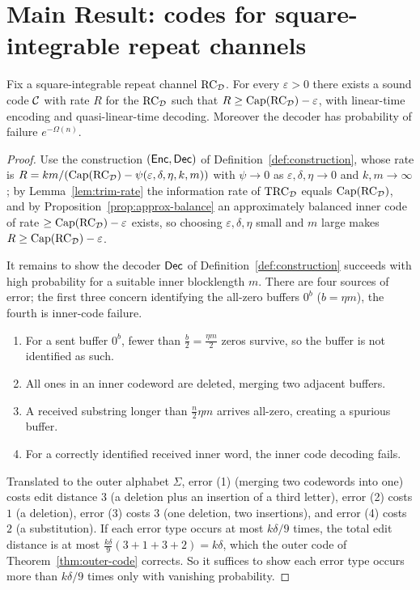 \chapter{Main Result: codes for square-integrable repeat channels}

\begin{theorem}
  \label{thm:main}
  Fix a square-integrable repeat channel $\mathrm{RC}_{\mathcal{D}}$. For every $\varepsilon>0$
  there exists a sound code $\mathcal{C}$ with rate $R$ for the $\mathrm{RC}_{\mathcal{D}}$ such that
  $R \ge \mathrm{Cap}(\mathrm{RC}_{\mathcal{D}})-\varepsilon$, with linear-time encoding and
  quasi-linear-time decoding. Moreover the decoder has probability of failure
  $e^{-\Omega(n)}$.
\end{theorem}
\begin{proof}
  Use the construction $(\mathsf{Enc},\mathsf{Dec})$ of Definition~\ref{def:construction}, whose
  rate is $R = km/(\mathrm{Cap}(\mathrm{RC}_{\mathcal{D}})-\psi(\varepsilon,\delta,\eta,k,m))$ with
  $\psi\to0$ as $\varepsilon,\delta,\eta\to0$ and $k,m\to\infty$; by
  Lemma~\ref{lem:trim-rate} the information rate of $\mathrm{TRC}_{\mathcal{D}}$ equals
  $\mathrm{Cap}(\mathrm{RC}_{\mathcal{D}})$, and by Proposition~\ref{prop:approx-balance} an
  approximately balanced inner code of rate $\ge \mathrm{Cap}(\mathrm{RC}_{\mathcal{D}})-\varepsilon$
  exists, so choosing $\varepsilon,\delta,\eta$ small and $m$ large makes
  $R \ge \mathrm{Cap}(\mathrm{RC}_{\mathcal{D}})-\varepsilon$.

  It remains to show the decoder $\mathsf{Dec}$ of Definition~\ref{def:construction}
  succeeds with high probability for a suitable inner blocklength $m$. There are
  four sources of error; the first three concern identifying the all-zero buffers
  $0^b$ ($b=\eta m$), the fourth is inner-code failure.
  \begin{enumerate}
    \item For a sent buffer $0^b$, fewer than $\tfrac{b}{2}=\tfrac{\eta m}{2}$
      zeros survive, so the buffer is not identified as such.
    \item All ones in an inner codeword are deleted, merging two adjacent buffers.
    \item A received substring longer than $\tfrac{n}{2}\eta m$ arrives all-zero,
      creating a spurious buffer.
    \item For a correctly identified received inner word, the inner code decoding
      fails.
  \end{enumerate}
  Translated to the outer alphabet $\Sigma$, error (1) (merging two codewords
  into one) costs edit distance $3$ (a deletion plus an insertion of a third
  letter), error (2) costs $1$ (a deletion), error (3) costs $3$ (one deletion,
  two insertions), and error (4) costs $2$ (a substitution). If each error type
  occurs at most $k\delta/9$ times, the total edit distance is at most
  $\tfrac{k\delta}{9}(3+1+3+2)=k\delta$, which the outer code of
  Theorem~\ref{thm:outer-code} corrects. So it suffices to show each error type
  occurs more than $k\delta/9$ times only with vanishing probability.


\end{proof}
